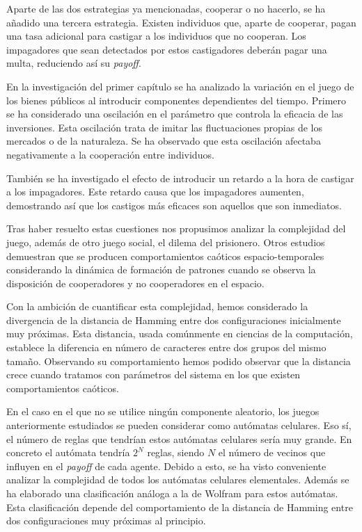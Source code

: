 Aparte de las dos estrategias ya mencionadas, cooperar o no hacerlo, se ha añadido una tercera estrategia. Existen individuos que, aparte de cooperar, pagan una tasa adicional para castigar a los individuos que no cooperan. Los impagadores que sean detectados por estos castigadores deberán pagar una multa, reduciendo así su \textit{payoff}.

En la investigación del primer capítulo se ha analizado la variación en el juego de los bienes públicos al introducir componentes dependientes del tiempo. Primero se ha considerado una oscilación en el parámetro que controla la eficacia de las inversiones. Esta oscilación trata de imitar las fluctuaciones propias de los mercados o de la naturaleza. Se ha observado que esta oscilación afectaba negativamente a la cooperación entre individuos. 

También se ha investigado el efecto de introducir un retardo a la hora de castigar a los impagadores. Este retardo causa que los impagadores aumenten, demostrando así que los castigos más eficaces son aquellos que son inmediatos.

Tras haber resuelto estas cuestiones nos propusimos analizar la complejidad del juego, además de otro juego social, el dilema del prisionero. Otros estudios demuestran que se producen comportamientos caóticos espacio-temporales considerando la dinámica de formación de patrones cuando se observa la disposición de cooperadores y no cooperadores en el espacio. 

Con la ambición de cuantificar esta complejidad, hemos considerado la divergencia de la distancia de Hamming entre dos configuraciones inicialmente muy próximas. Esta distancia, usada comúnmente en ciencias de la computación, establece la diferencia en número de caracteres entre dos grupos del mismo tamaño. Observando su comportamiento hemos podido observar que la distancia crece cuando tratamos con parámetros del sistema en los que existen comportamientos caóticos.

En el caso en el que no se utilice ningún componente aleatorio, los juegos anteriormente estudiados se pueden considerar como autómatas celulares. Eso sí, el número de reglas que tendrían estos autómatas celulares sería muy grande. En concreto el autómata tendría $2^N$ reglas, siendo $N$ el número de vecinos que influyen en el \textit{payoff} de cada agente. Debido a esto, se ha visto conveniente analizar la complejidad de todos los autómatas celulares elementales. Además se ha elaborado una clasificación análoga a la de Wolfram para estos autómatas. Esta clasificación depende del comportamiento de la distancia de Hamming entre dos configuraciones muy próximas al principio.

